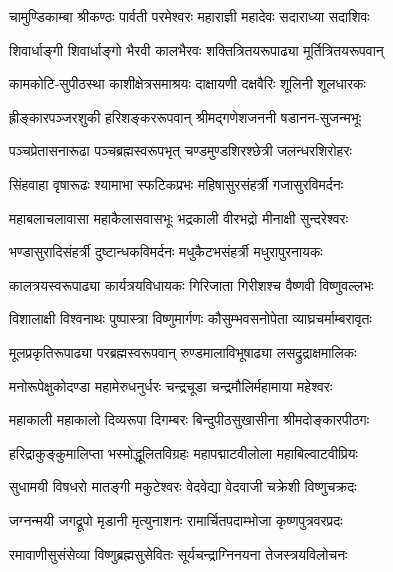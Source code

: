 


\twolineshloka
{चामुण्डिकाम्बा श्रीकण्ठः पार्वती परमेश्वरः}
{महाराज्ञी महादेवः सदाराध्या सदाशिवः}%

\twolineshloka
{शिवार्धाङ्गी शिवार्धाङ्गो भैरवी कालभैरवः}
{शक्तित्रितयरूपाढ्या मूर्तित्रितयरूपवान्}%

\twolineshloka
{कामकोटि-सुपीठस्था काशीक्षेत्रसमाश्रयः}
{दाक्षायणी दक्षवैरिः शूलिनी शूलधारकः}%

\twolineshloka
{ह्रीङ्कारपञ्जरशुकी हरिशङ्कररूपवान्}
{श्रीमद्गणेशजननी षडानन-सुजन्मभूः}%

\twolineshloka
{पञ्चप्रेतासनारूढा पञ्चब्रह्मस्वरूपभृत्}
{चण्डमुण्डशिरश्छेत्री जलन्धरशिरोहरः}%

\twolineshloka
{सिंहवाहा वृषारूढः  श्यामाभा स्फटिकप्रभः}
{महिषासुरसंहर्त्री गजासुरविमर्दनः}%

\twolineshloka
{महाबलाचलावासा महाकैलासवासभूः}
{भद्रकाली वीरभद्रो मीनाक्षी सुन्दरेश्वरः}%

\twolineshloka
{भण्डासुरादिसंहर्त्री दुष्टान्धकविमर्दनः}
{मधुकैटभसंहर्त्री मधुरापुरनायकः}%

\twolineshloka
{कालत्रयस्वरूपाढ्या कार्यत्रयविधायकः}
{गिरिजाता गिरीशश्च वैष्णवी विष्णुवल्लभः}%

\twolineshloka
{विशालाक्षी विश्वनाथः पुष्पास्त्रा विष्णुमार्गणः}
{कौसुम्भवसनोपेता व्याघ्रचर्माम्बरावृतः}%

\twolineshloka
{मूलप्रकृतिरूपाढ्या परब्रह्मस्वरूपवान्}
{रुण्डमालाविभूषाढ्या लसद्रुद्राक्षमालिकः}%

\twolineshloka
{मनोरूपेक्षुकोदण्डा महामेरुधनुर्धरः}
{चन्द्रचूडा चन्द्रमौलिर्महामाया महेश्वरः}%

\twolineshloka
{महाकाली महाकालो दिव्यरूपा दिगम्बरः}
{बिन्दुपीठसुखासीना श्रीमदोङ्कारपीठगः}%

\twolineshloka
{हरिद्राकुङ्कुमालिप्ता भस्मोद्धूलितविग्रहः}
{महापद्माटवीलोला महाबिल्वाटवीप्रियः}%

\twolineshloka
{सुधामयी विषधरो मातङ्गी मकुटेश्वरः}
{वेदवेद्या वेदवाजी चक्रेशी विष्णुचक्रदः}%

\twolineshloka
{जग्नन्मयी जगद्रूपो मृडानी मृत्युनाशनः}
{रामार्चितपदाम्भोजा कृष्णपुत्रवरप्रदः}%

\twolineshloka
{रमावाणीसुसंसेव्या विष्णुब्रह्मसुसेवितः}
{सूर्यचन्द्राग्निनयना तेजस्त्रयविलोचनः}%

